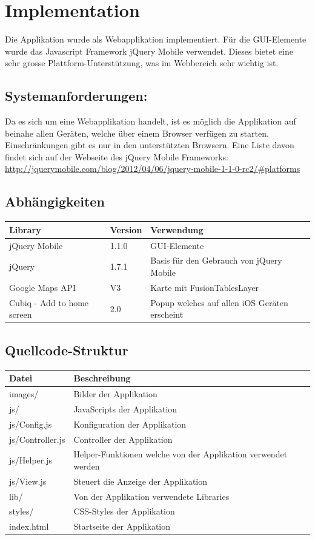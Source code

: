 \section{Implementation}
Die Applikation wurde als Webapplikation implementiert. Für die GUI-Elemente wurde das Javascript Framework jQuery Mobile verwendet. Dieses bietet eine sehr grosse Plattform-Unterstützung, was im Webbereich sehr wichtig ist.

\subsection{Systemanforderungen:}
Da es sich um eine Webapplikation handelt, ist es möglich die Applikation auf beinahe allen Geräten, welche über einem Browser verfügen zu starten. Einschränkungen gibt es nur in den unterstützten Browsern. Eine Liste davon findet sich auf der Webseite des jQuery Mobile Frameworks:  \url{http://jquerymobile.com/blog/2012/04/06/jquery-mobile-1-1-0-rc2/#platforms}

\subsection{Abhängigkeiten}
\begin{tabular}{|l|l|p{8cm}|}
\hline 
\textbf{Library} & \textbf{Version} & \textbf{Verwendung} \\ 
\hline 
jQuery Mobile & 1.1.0 & GUI-Elemente \\ 
\hline 
jQuery & 1.7.1 & Basis für den Gebrauch von jQuery Mobile \\ 
\hline 
Google Maps API & V3 & Karte mit FusionTablesLayer \\ 
\hline 
Cubiq - Add to home screen & 2.0 & Popup welches auf allen iOS Geräten erscheint \\ 
\hline 
\end{tabular} 

\subsection{Quellcode-Struktur}
\begin{tabular}{|l|l|}
\hline 
\textbf{Datei} & \textbf{Beschreibung} \\ 
\hline 
images/ & Bilder der Applikation \\ 
\hline 
js/ & JavaScripts der Applikation \\ 
\hline 
js/Config.js & Konfiguration der Applikation \\ 
\hline 
js/Controller.js & Controller der Applikation \\ 
\hline 
js/Helper.js & Helper-Funktionen welche von der Applikation verwendet werden \\ 
\hline 
js/View.js & Steuert die Anzeige der Applikation \\ 
\hline 
lib/ & Von der Applikation verwendete Libraries \\ 
\hline 
styles/ & CSS-Styles der Applikation \\ 
\hline
index.html & Startseite der Applikation \\ 
\hline
\end{tabular} 

